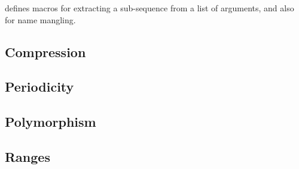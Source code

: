\def\Subsection#1{\subsection{#1}}

 defines macros for extracting a sub-sequence
from a list of arguments, and also for name mangling.

\Subsection{Compression}

\Subsection{Periodicity}

\Subsection{Polymorphism}

\Subsection{Ranges}
